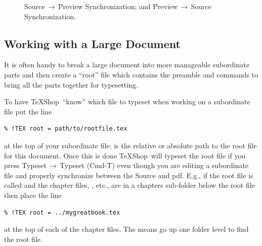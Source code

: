 \documentclass[letterpaper,11pt]{article}
\newcommand{\TS}{\textsf{\TeX Shop}}
\newcommand{\acr}[1]{\textsf{#1}}
\newcommand{\cmd}[1]{\textsf{#1}}
\newcommand{\mnu}[1]{\textsf{#1}}
\newcommand{\To}{\,\(\to\)\,}
\begin{document}
\begin{figure}
\centering
{}%
\qquad%
%
\caption[Source/Preview Synch.]{
 Source\To Preview Synchronization; and
 Preview\To Source Synchronization.}
\label{fig:SourcePreviewSync}
\end{figure}

\subsection{Working with a Large Document}\label{sec:root}

It is often handy to break a large document into more manageable subordinate parts and then create a ``root'' file which contains the preamble and \verb|| commands to bring all the parts together for typesetting.

To have \TS\ ``know'' which file to typeset when working on a subordinate file put the line
\begin{verbatim}
% !TEX root = path/to/rootfile.tex
\end{verbatim}
at the top of your subordinate file;  is the relative or absolute path to the root file for this document. Once this is done \TS\ will typeset the root file if you press \mnu{Typeset}\To\mnu{Typeset} (\cmd{Cmd-T}) even though you are editing a subordinate file and properly synchronize between the Source and \acr{pdf}. E.g., if the root file is called  and the chapter files, , etc., are in a \cmd{chapters} sub-folder below the root file then place the line
\begin{verbatim}
% !TEX root = ../mygreatbook.tex
\end{verbatim}
at the top of each of the chapter files. The  means go up one folder level to find the root file.
\end{document}
